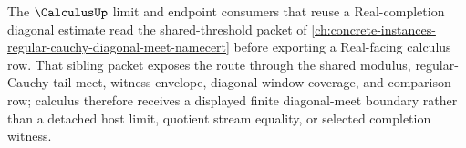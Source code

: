 The $\CalculusUp$ limit and endpoint consumers that reuse a Real-completion diagonal estimate read the shared-threshold packet of \autoref{ch:concrete-instances-regular-cauchy-diagonal-meet-namecert} before exporting a Real-facing calculus row. That sibling packet exposes the route through the shared modulus, regular-Cauchy tail meet, witness envelope, diagonal-window coverage, and comparison row; calculus therefore receives a displayed finite diagonal-meet boundary rather than a detached host limit, quotient stream equality, or selected completion witness.
